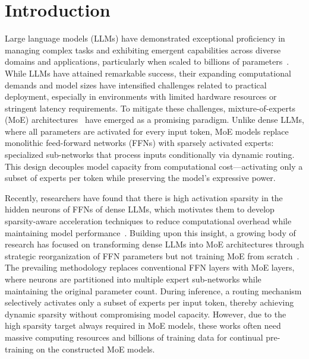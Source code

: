 \section{Introduction}

Large language models (LLMs) have demonstrated exceptional proficiency in managing complex tasks and exhibiting emergent capabilities across diverse domains and applications,
particularly when scaled to billions of parameters~\cite{zhang2022opt, touvron2023llama, liu2024visual, liu2024deepseek}. 
While LLMs have attained remarkable success, their expanding computational demands and model sizes have intensified challenges related to practical deployment,
especially in environments with limited hardware resources or stringent latency requirements.
To mitigate these challenges, mixture-of-experts (MoE) architectures~\cite{lepikhin2020gshard, du2022glam,fedus2022switch,dai2024deepseekmoe} have emerged as a promising paradigm. 
Unlike dense LLMs, where all parameters are activated for every input token, MoE models replace monolithic feed-forward networks (FFNs) with sparsely activated experts: specialized sub-networks that process inputs conditionally via dynamic routing. 
This design decouples model capacity from computational cost—activating only a subset of experts per token while preserving the model’s expressive power.

Recently, researchers have found that there is high activation sparsity in the hidden neurons of FFNs of dense LLMs,
which motivates them to develop sparsity-aware acceleration techniques to reduce computational overhead while maintaining model performance~\cite{dejavu,moefication}.
Building upon this insight, a growing body of research has focused on transforming dense LLMs into MoE architectures through strategic reorganization of FFN parameters but not training MoE from scratch~\cite{llama-moe,llama-moe-v2,zheng2024learn}. 
The prevailing methodology replaces conventional FFN layers with MoE layers,
where neurons are partitioned into multiple expert sub-networks while maintaining the original parameter count. 
During inference, a routing mechanism selectively activates only a subset of experts per input token, thereby achieving dynamic sparsity without compromising model capacity.
However, due to the high sparsity target always required in MoE models,
these works often need massive computing resources and billions of training data for continual pre-training on the constructed MoE models.

